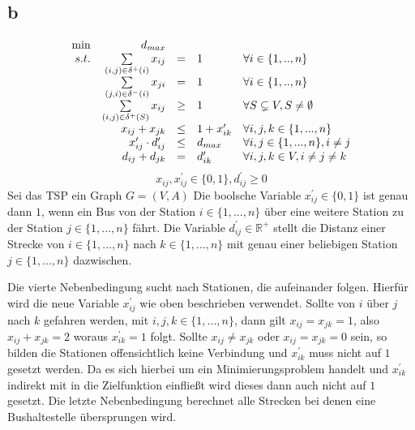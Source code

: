 \documentclass[10pt]{article}
\begin{document}
    \subsection*{b}
      \begin{displaymath}
        \begin{array}{ r r c l l }
          \min & d_{max} & & & \\
          s.t. & \sum\limits_{(i,j)\in \delta^{+}(i)} x_{ij} & = & 1 & \forall 
            i\in \{1,..,n\}\\
               & \sum\limits_{(j,i)\in \delta^{-}(i)} x_{ji} & = & 1 & \forall 
            i\in \{1,..,n\}\\
              & \sum\limits_{(i,j)\in \delta^{+}(S)} x_{ij} & \geq &  1 & \forall
            S\subsetneq V, S\neq \emptyset \\
            & x_{ij} + x_{jk} & \leq &1 + x_{ik}^{\prime} & \forall
                i,j,k \in \{1,...,n\} \\
            & x_{ij}^{\prime}\cdot d_{ij}^{\prime} &\leq&
              d_{max} & \forall i,j \in \{1,...,n\}, i\neq j \\
            & d_{ij} + d_{jk} &=& d^{\prime}_{ik} & \forall i,j,k\in V, i\neq j
                \neq k
        \end{array}
      \end{displaymath}
      \begin{displaymath}
        x_{ij},x_{ij}^{\prime}\in\{0,1\}, d_{ij}^{\prime} \geq 0
      \end{displaymath}
      Sei das TSP ein Graph $G=(V,A)$
      Die boolsche Variable $x_{ij}^{\prime} \in \{0,1\}$ ist genau dann $1$,
      wenn ein Bus von der Station $i \in \{1,...,n\}$ über eine weitere Station 
      zu der Station $j\in \{1,...,n\}$ fährt. Die Variable $d_{ij}^{\prime} \in
      \mathbb{R}^{+}$ stellt die Distanz einer Strecke von $i \in \{1,...,n\}$
      nach $k\in\{1,...,n\}$ mit genau einer beliebigen Station $j\in
      \{1,...,n\}$ dazwischen. 

      Die vierte
      Nebenbedingung sucht nach Stationen, die aufeinander folgen. Hierfür wird
      die neue Variable $x_{ij}^{\prime}$ wie oben beschrieben verwendet.
      Sollte von $i$ über $j$ nach $k$ gefahren werden, mit
      $i,j,k\in\{1,...,n\}$, dann gilt $x_{ij}=x_{jk}=1$, also $x_{ij}+x_{jk}=2$
      woraus $x_{ik}^{\prime}=1$ folgt. Sollte $x_{ij} \neq x_{jk}$ oder
      $x_{ij}=x_{jk}=0$ sein, so bilden die Stationen offensichtlich keine
      Verbindung und $x_{ik}^{\prime}$ muss nicht auf $1$ gesetzt werden. Da es
      sich hierbei um ein Minimierungsproblem handelt und $x_{ik}^{\prime}$
      indirekt mit in die Zielfunktion einfließt wird dieses dann auch nicht auf
      $1$ gesetzt.
      Die letzte Nebenbedingung berechnet alle Strecken bei denen eine
      Bushaltestelle übersprungen wird.
\end{document}
